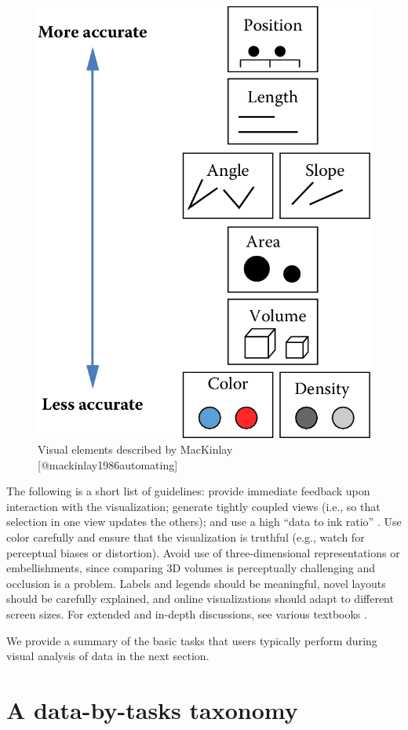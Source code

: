 \documentclass[]{krantz}
\begin{document}
\begin{figure}

{\centering \includegraphics[width=0.5\linewidth]{ChapterViz/figures/fig9-4} 

}

\caption{Visual elements described by MacKinlay [@mackinlay1986automating]}\label{fig:fig9-4}
\end{figure}

The following is a short list of guidelines: provide immediate feedback
upon interaction with the visualization; generate tightly coupled views
(i.e., so that selection in one view updates the others); and use a high
``data to ink ratio'' \citep{edward2001visual}. Use color carefully and
ensure that the visualization is truthful (e.g., watch for perceptual
biases or distortion). Avoid use of three-dimensional representations or
embellishments, since comparing 3D volumes is perceptually challenging
and occlusion is a problem. Labels and legends should be meaningful,
novel layouts should be carefully explained, and online visualizations
should adapt to different screen sizes. For extended and in-depth
discussions, see various textbooks
\citep{few2009now, kirk2012data, ward2010interactive, munzner2014visualization, edward2001visual, edward2006beauty}.

We provide a summary of the basic tasks that users typically perform
during visual analysis of data in the next section.

\section{A data-by-tasks taxonomy}\label{sec:viz-3}
\end{document}

